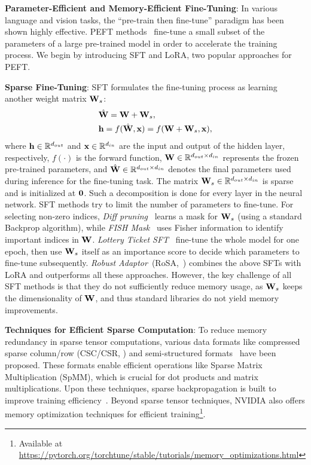 \textbf{Parameter-Efficient and Memory-Efficient Fine-Tuning}: In various language and vision tasks, the ``pre-train then fine-tune'' paradigm has been shown highly effective. PEFT methods~\cite{lialin2023scaling} fine-tune a small subset of the parameters of a large pre-trained model in order to accelerate the training process. We begin by introducing SFT and LoRA, two popular approaches for PEFT. 

\textbf{Sparse Fine-Tuning}: SFT formulates the fine-tuning process as learning another weight matrix ${\mathbf{W}}_s$: 
\begin{align}
     &\hat{{\mathbf{W}}}={\mathbf{W}} + {\mathbf{W}}_s, \label{eq:sft_w}
     \\&{\mathbf{h}} = f(\hat{{\mathbf{W}}},{\mathbf{x}}) = f({\mathbf{W}} + {\mathbf{W}}_s, {\mathbf{x}}), \label{eq:sft_fwd}
\end{align}
where ${\mathbf{h}}\in\mathbb{R}^{d_{out}}$ and ${\mathbf{x}}\in\mathbb{R}^{d_{in}}$ are the input and output of the hidden layer, respectively, $f(\cdot)$ is the forward function, ${\mathbf{W}}\in \mathbb{R}^{d_{out}\times d_{in}}$ represents the frozen pre-trained parameters, and $\hat{{\mathbf{W}}}\in \mathbb{R}^{d_{out}\times d_{in}}$ denotes the final parameters used during inference for the fine-tuning task.  %
The matrix ${\mathbf{W}}_s\in \mathbb{R}^{d_{out}\times d_{in}}$ is sparse and is initialized at ${\bm 0}$. Such a decomposition is done for every layer in the neural network. SFT methods try to limit the number of parameters to fine-tune. For selecting non-zero indices, \emph{Diff pruning}~\cite{guo2021parameter} learns a mask for ${\mathbf{W}}_s$ (using a standard Backprop algorithm), while \emph{FISH Mask}~\cite{sung2021training} uses Fisher information to identify important indices in ${\mathbf{W}}$. \emph{Lottery Ticket SFT}~\cite{ansell2022composable} fine-tune the whole model for one epoch, then use ${\mathbf{W}}_s$ itself as an importance score to decide which parameters to fine-tune subsequently. \emph{Robust Adaptor}~(RoSA,~\citealt{nikdan2024rosa}) combines the above SFTs with LoRA and outperforms all these approaches.
However, the key challenge of all SFT methods is that they do not sufficiently reduce memory usage, as ${\mathbf{W}}_s$ keeps the dimensionality of ${\mathbf{W}}$, and thus standard libraries do not yield memory improvements. %

\textbf{Techniques for Efficient Sparse Computation}: To reduce memory redundancy in sparse tensor computations, various data formats like compressed sparse column/row (CSC/CSR, \citealp{mofrad2019multithreaded, lu2024spp}) and semi-structured formats~\citep{holmes2021nxmtransformer} have been proposed. These formats enable efficient operations like Sparse Matrix Multiplication (SpMM), which is crucial for dot products and matrix multiplications. Upon these techniques, sparse backpropagation is built to improve training efficiency~\citep{zhang2020sparch, gale2020sparse, peste2021ac, schwarz2021powerpropagation, hoefler2021sparsity,jiang2022exposing, pmlr-v202-nikdan23a, xu2024survey}. Beyond sparse tensor techniques, NVIDIA also offers memory optimization techniques for efficient training\footnote{Available at \url{https://pytorch.org/torchtune/stable/tutorials/memory_optimizations.html}}.

